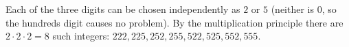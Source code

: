 Each of the three digits can be chosen independently as $2$ or $5$ (neither is $0$, so the hundreds digit causes no problem). By the multiplication principle there are $2\cdot2\cdot2=\boxed{8}$ such integers: $222,225,252,255,522,525,552,555$.

